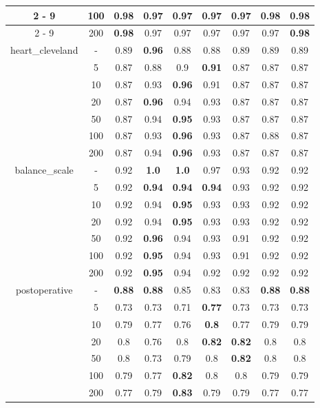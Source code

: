\documentclass{article}%
\begin{document}
\begin{longtable}{c|c|ccccccc}
\cline{2%
-%
9}%
&100&\textbf{0.98}&0.97&0.97&0.97&0.97&\textbf{0.98}&\textbf{0.98}\\%
\cline{2%
-%
9}%
&200&\textbf{0.98}&0.97&0.97&0.97&0.97&0.97&\textbf{0.98}\\%
\hline%
\multirow{7}{*}{heart\_cleveland}&{-}&0.89&\textbf{0.96}&0.88&0.88&0.89&0.89&0.89\\%
\cline{2%
-%
9}%
&5&0.87&0.88&0.9&\textbf{0.91}&0.87&0.87&0.87\\%
\cline{2%
-%
9}%
&10&0.87&0.93&\textbf{0.96}&0.91&0.87&0.87&0.87\\%
\cline{2%
-%
9}%
&20&0.87&\textbf{0.96}&0.94&0.93&0.87&0.87&0.87\\%
\cline{2%
-%
9}%
&50&0.87&0.94&\textbf{0.95}&0.93&0.87&0.87&0.87\\%
\cline{2%
-%
9}%
&100&0.87&0.93&\textbf{0.96}&0.93&0.87&0.88&0.87\\%
\cline{2%
-%
9}%
&200&0.87&0.94&\textbf{0.96}&0.93&0.87&0.87&0.87\\%
\hline%
\multirow{7}{*}{balance\_scale}&{-}&0.92&\textbf{1.0}&\textbf{1.0}&0.97&0.93&0.92&0.92\\%
\cline{2%
-%
9}%
&5&0.92&\textbf{0.94}&\textbf{0.94}&\textbf{0.94}&0.93&0.92&0.92\\%
\cline{2%
-%
9}%
&10&0.92&0.94&\textbf{0.95}&0.93&0.93&0.92&0.92\\%
\cline{2%
-%
9}%
&20&0.92&0.94&\textbf{0.95}&0.93&0.93&0.92&0.92\\%
\cline{2%
-%
9}%
&50&0.92&\textbf{0.96}&0.94&0.93&0.91&0.92&0.92\\%
\cline{2%
-%
9}%
&100&0.92&\textbf{0.95}&0.94&0.93&0.91&0.92&0.92\\%
\cline{2%
-%
9}%
&200&0.92&\textbf{0.95}&0.94&0.92&0.92&0.92&0.92\\%
\hline%
\multirow{7}{*}{postoperative}&{-}&\textbf{0.88}&\textbf{0.88}&0.85&0.83&0.83&\textbf{0.88}&\textbf{0.88}\\%
\cline{2%
-%
9}%
&5&0.73&0.73&0.71&\textbf{0.77}&0.73&0.73&0.73\\%
\cline{2%
-%
9}%
&10&0.79&0.77&0.76&\textbf{0.8}&0.77&0.79&0.79\\%
\cline{2%
-%
9}%
&20&0.8&0.76&0.8&\textbf{0.82}&\textbf{0.82}&0.8&0.8\\%
\cline{2%
-%
9}%
&50&0.8&0.73&0.79&0.8&\textbf{0.82}&0.8&0.8\\%
\cline{2%
-%
9}%
&100&0.79&0.77&\textbf{0.82}&0.8&0.8&0.79&0.79\\%
\cline{2%
-%
9}%
&200&0.77&0.79&\textbf{0.83}&0.79&0.79&0.77&0.77\\%
\hline%
\end{longtable}
\end{document}
